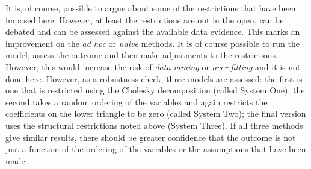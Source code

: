 \documentclass[12pt, a4paper, oneside]{article}\usepackage[]{graphicx}\usepackage[]{color}
\begin{document}
It is, of course, possible to argue about some of the restrictions that have been imposed here.  However, at least the restrictions are out in the open, can be debated and can be assessed against the available data evidence.  This marks an improvement on the \emph{ad hoc} or \emph{naive} methods.  It is  of course possible to run the model, assess the outcome and then make adjustments to the restrictions.  However, this would increase the risk of \emph{data mining} or \emph{over-fitting} and it is not done here.  However, as a robustness check, three models are assessed:  the first is one that is restricted using the Cholesky decomposition (called System One); the second takes a random ordering of the variables and again restricts the coefficients on the lower triangle to be zero (called System Two); the final version uses the structural restrictions noted above (System Three).  If all three methods give similar results, there should be greater confidence that the outcome is not just a function of the ordering of the variables or the assumptions that have been made. %

\end{document}
